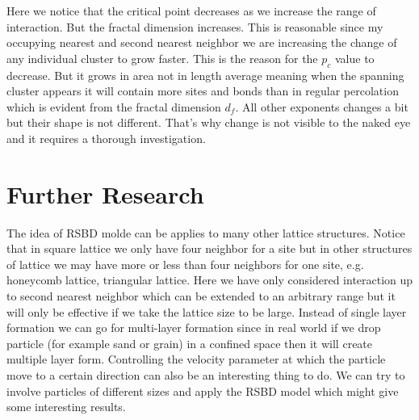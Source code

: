 Here we notice that the critical point decreases as we increase the range of interaction. But the fractal dimension increases. This is reasonable since my occupying nearest and second nearest neighbor we are increasing the change of any individual cluster to grow faster. This is the reason for the $p_c$ value to decrease. But it grows in area not in length average meaning when the spanning cluster appears it will contain more sites and bonds than in regular percolation which is evident from the fractal dimension $d_f$.
All other exponents changes a bit but their shape is not different. That's why change is not visible to the naked eye and it requires a thorough investigation.

\clearpage
\section{Further Research}
	The idea of RSBD molde can be applies to many other lattice structures. Notice that in square lattice we only have four neighbor for a site but in other structures of lattice we may have more or less than four neighbors for one site, e.g. honeycomb lattice, triangular lattice. Here we have only considered interaction up to second nearest neighbor which can be extended to an arbitrary range but it will only be effective if we take the lattice size to be large. Instead of single layer formation we can go for multi-layer formation since in real world if we drop particle (for example sand or grain) in a confined space then it will create multiple layer form. Controlling the velocity parameter at which the particle move to a certain direction can also be an interesting thing to do. We can try to involve particles of different sizes and apply the RSBD model which might give some interesting results.